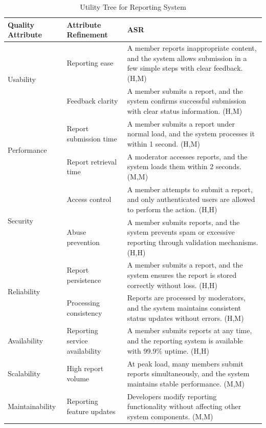 \documentclass{article}
\begin{document}
\begin{table}[H]
\centering
\caption{Utility Tree for Reporting System}
\begin{tabular}{|p{3cm}|p{4cm}|p{7cm}|}
\hline
\textbf{Quality Attribute} & \textbf{Attribute Refinement} & \textbf{ASR} \\
\hline

\multirow{2}{*}{Usability}
& Reporting ease
& A member reports inappropriate content, and the system allows submission in a few simple steps with clear feedback. (H,M) \\
\cline{2-3}
& Feedback clarity
& A member submits a report, and the system confirms successful submission with clear status information. (H,M) \\
\hline

\multirow{2}{*}{Performance}
& Report submission time
& A member submits a report under normal load, and the system processes it within 1 second. (H,M) \\
\cline{2-3}
& Report retrieval time
& A moderator accesses reports, and the system loads them within 2 seconds. (M,M) \\
\hline

\multirow{2}{*}{Security}
& Access control
& A member attempts to submit a report, and only authenticated users are allowed to perform the action. (H,H) \\
\cline{2-3}
& Abuse prevention
& A member submits reports, and the system prevents spam or excessive reporting through validation mechanisms. (H,H) \\
\hline

\multirow{2}{*}{Reliability}
& Report persistence
& A member submits a report, and the system ensures the report is stored correctly without loss. (H,H) \\
\cline{2-3}
& Processing consistency
& Reports are processed by moderators, and the system maintains consistent status updates without errors. (H,M) \\
\hline

Availability
& Reporting service availability
& A member submits reports at any time, and the reporting system is available with 99.9\% uptime. (H,H) \\
\hline

Scalability
& High report volume
& At peak load, many members submit reports simultaneously, and the system maintains stable performance. (M,M) \\
\hline

Maintainability
& Reporting feature updates
& Developers modify reporting functionality without affecting other system components. (M,M) \\
\hline


\end{tabular}
\end{table}
\end{document}
